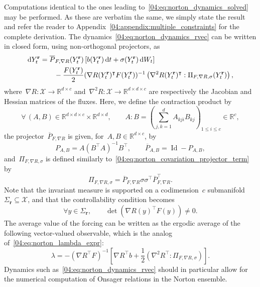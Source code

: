     Computations identical to the ones leading to~\eqref{04:eq:norton_dynamics_solved} may be performed. As these are verbatim the same, we simply state the result and refer the reader to Appendix~\ref{04:appendix:multiple_constraints} for the complete derivation. The dynamics~\eqref{04:eq:norton_dynamics_rvec} can be written in closed form, using non-orthogonal projectors, as
    \begin{equation}
    \label{04:eq:norton_multiple_constraints}
        \begin{aligned}
        \mathrm{d} Y^{\mathbf{r}}_t &=\overline{P}_{F,\nabla R}(Y^{\mathbf{r}}_t)\left[b(Y^{\mathbf{r}}_t)\,\mathrm{d} t +\sigma(Y^{\mathbf{r}}_t)\,\mathrm{d} W_t\right]\\
        &\qquad- \frac{F(Y^{\mathbf{r}}_t)}2(\nabla R(Y^{\mathbf{r}}_t)^\intercal F(Y^{\mathbf{r}}_t))^{-1}\left(\nabla^2 R(Y^{\mathbf{r}}_t)^\intercal: \Pi_{F,\nabla R,\sigma}(Y^{\mathbf{r}}_t)\right),
    \end{aligned}
    \end{equation}
    where~$\nabla R : \mathcal X\to \mathbb{R}^{d\times c}$ and~$\nabla^2 R: \mathcal X \to \mathbb{R}^{d\times d\times c}$ are respectively the Jacobian and Hessian matrices of the fluxes. Here, we define the contraction product by
    \[\forall\, (A,B)\in \mathbb{R}^{d\times d\times c}\times\mathbb{R}^{d\times d},\qquad A:B = \left(\sum_{j,k=1}^d A_{kji}B_{kj}\right)_{1\leq i\leq c}\in\mathbb{R}^c,\]
    the projector~$\overline{P}_{F,\nabla R}$ is given, for~$A,B\in \mathbb{R}^{d\times c}$, by
    \[P_{A,B} = A(B^\intercal A)^{-1}B^\intercal,\qquad \overline{P}_{A,B} = \operatorname{Id}-P_{A,B},\]
    and~$\Pi_{F,\nabla R,\sigma}$ is defined similarly to~\eqref{04:eq:norton_covariation_projector_term} by
    \begin{equation*}
            \Pi_{F,\nabla R,\sigma}=\overline{P}_{F,\nabla R} \sigma\sigma ^\intercal \overline{P}_{F,\nabla R}^\intercal.
    \end{equation*}
    Note that the invariant measure is supported on a codimension~$c$ submanifold~$\Sigma_{\mathbf{r}}\subseteq \mathcal{X}$, and that the controllability condition becomes
    \begin{equation}
        \forall y\in \Sigma_{\mathbf{r}},\qquad\operatorname{det}(\nabla R(y)^\intercal F(y)) \neq 0.
    \end{equation}
    The average value of the forcing can be written as the ergodic average of the following vector-valued observable, which is the analog of~\eqref{04:eq:norton_lambda_expr}:
    \begin{equation}
        \lambda = -(\nabla R^\intercal F)^{-1}\left[\nabla R^\intercal b + \frac12\left(\nabla^2 R^\intercal: \Pi_{F,\nabla R,\sigma}\right)\right].
    \end{equation}
    Dynamics such as~\eqref{04:eq:norton_dynamics_rvec} should in particular allow for the numerical computation of Onsager relations in the Norton ensemble.
    
